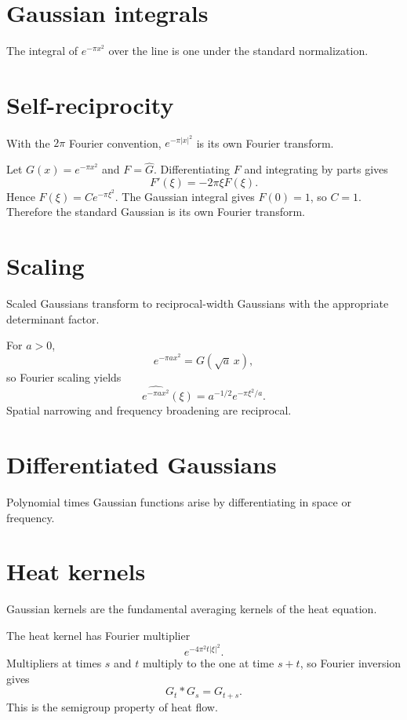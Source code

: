 \section{Gaussian integrals}
The integral of $e^{-\pi x^2}$ over the line is one under the standard normalization.

\section{Self-reciprocity}
With the $2\pi$ Fourier convention, $e^{-\pi|x|^2}$ is its own Fourier transform.


\begin{example}\label{ex:iii12-expand-01}
Let \(G(x)=e^{-\pi x^2}\) and \(F=\widehat G\). Differentiating \(F\) and
integrating by parts gives
\[
F'(\xi)=-2\pi\xi F(\xi).
\]
Hence \(F(\xi)=Ce^{-\pi\xi^2}\). The Gaussian integral gives \(F(0)=1\),
so \(C=1\). Therefore the standard Gaussian is its own Fourier transform.
\end{example}
\section{Scaling}
Scaled Gaussians transform to reciprocal-width Gaussians with the appropriate determinant factor.


\begin{example}\label{ex:iii12-expand-02}
For \(a>0\),
\[
e^{-\pi a x^2}=G(\sqrt a\,x),
\]
so Fourier scaling yields
\[
\widehat{e^{-\pi a x^2}}(\xi)
=a^{-1/2}e^{-\pi\xi^2/a}.
\]
Spatial narrowing and frequency broadening are reciprocal.
\end{example}
\section{Differentiated Gaussians}
Polynomial times Gaussian functions arise by differentiating in space or frequency.

\section{Heat kernels}
Gaussian kernels are the fundamental averaging kernels of the heat equation.


\begin{example}\label{ex:iii12-expand-03}
The heat kernel has Fourier multiplier
\[
e^{-4\pi^2t|\xi|^2}.
\]
Multipliers at times \(s\) and \(t\) multiply to the one at time \(s+t\), so
Fourier inversion gives
\[
G_t*G_s=G_{t+s}.
\]
This is the semigroup property of heat flow.
\end{example}
